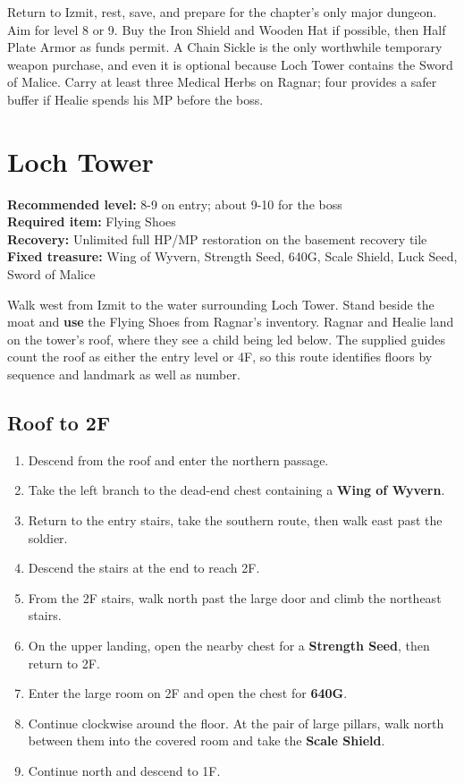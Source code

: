 \documentclass[
  american,
  10pt,
  letterpaper,
  oneside,
  open=any]{scrreprt}
\providecommand{\tightlist}{%
  \setlength{\itemsep}{0pt}\setlength{\parskip}{0pt}}
\begin{document}
Return to Izmit, rest, save, and prepare for the chapter's only major
dungeon. Aim for level 8 or 9. Buy the Iron Shield and Wooden Hat if
possible, then Half Plate Armor as funds permit. A Chain Sickle is the
only worthwhile temporary weapon purchase, and even it is optional
because Loch Tower contains the Sword of Malice. Carry at least three
Medical Herbs on Ragnar; four provides a safer buffer if Healie spends
his MP before the boss.

\section{Loch Tower}\label{loch-tower}

\textbf{Recommended level:} 8-9 on entry; about 9-10 for the boss\\
\textbf{Required item:} Flying Shoes\\
\textbf{Recovery:} Unlimited full HP/MP restoration on the basement
recovery tile\\
\textbf{Fixed treasure:} Wing of Wyvern, Strength Seed, 640G, Scale
Shield, Luck Seed, Sword of Malice

Walk west from Izmit to the water surrounding Loch Tower. Stand beside
the moat and \textbf{use} the Flying Shoes from Ragnar's inventory.
Ragnar and Healie land on the tower's roof, where they see a child being
led below. The supplied guides count the roof as either the entry level
or 4F, so this route identifies floors by sequence and landmark as well
as number.

\subsection{Roof to 2F}\label{roof-to-2f}

\begin{enumerate}
\def\labelenumi{\arabic{enumi}.}
\tightlist
\item
  Descend from the roof and enter the northern passage.
\item
  Take the left branch to the dead-end chest containing a \textbf{Wing
  of Wyvern}.
\item
  Return to the entry stairs, take the southern route, then walk east
  past the soldier.
\item
  Descend the stairs at the end to reach 2F.
\item
  From the 2F stairs, walk north past the large door and climb the
  northeast stairs.
\item
  On the upper landing, open the nearby chest for a \textbf{Strength
  Seed}, then return to 2F.
\item
  Enter the large room on 2F and open the chest for \textbf{640G}.
\item
  Continue clockwise around the floor. At the pair of large pillars,
  walk north between them into the covered room and take the
  \textbf{Scale Shield}.
\item
  Continue north and descend to 1F.
\end{enumerate}
\end{document}
